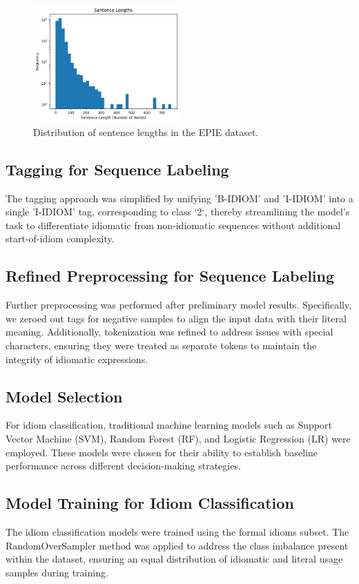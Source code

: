 \documentclass[conference]{IEEEtran}
\begin{document}
\begin{figure}[htbp]
\centerline{\includegraphics[width=0.5\textwidth]{fig_sentence_length_distribution.png}}
\caption{Distribution of sentence lengths in the EPIE dataset.}
\end{figure}

\subsection{Tagging for Sequence Labeling}
The tagging approach was simplified by unifying 'B-IDIOM' and 'I-IDIOM' into a single 'I-IDIOM' tag, corresponding to class `2`, thereby streamlining the model's task to differentiate idiomatic from non-idiomatic sequences without additional start-of-idiom complexity.

\subsection{Refined Preprocessing for Sequence Labeling}
Further preprocessing was performed after preliminary model results. Specifically, we zeroed out tags for negative samples to align the input data with their literal meaning. Additionally, tokenization was refined to address issues with special characters, ensuring they were treated as separate tokens to maintain the integrity of idiomatic expressions.

\subsection{Model Selection}
For idiom classification, traditional machine learning models such as Support Vector Machine (SVM), Random Forest (RF), and Logistic Regression (LR) were employed. These models were chosen for their ability to establish baseline performance across different decision-making strategies.

\subsection{Model Training for Idiom Classification}
The idiom classification models were trained using the formal idioms subset. The RandomOverSampler method was applied to address the class imbalance present within the dataset, ensuring an equal distribution of idiomatic and literal usage samples during training.
\end{document}
